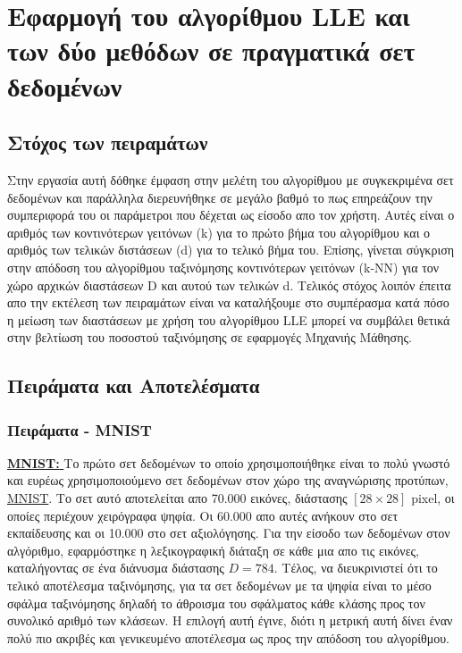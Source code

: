 \chapter{Εφαρμογή του αλγορίθμου \textlatin{LLE} και των δύο μεθόδων σε πραγματικά σετ δεδομένων}
\section{Στόχος των πειραμάτων}
\par
Στην εργασία αυτή δόθηκε έμφαση στην μελέτη του αλγορίθμου με συγκεκριμένα σετ δεδομένων και παράλληλα διερευνήθηκε σε μεγάλο βαθμό το πως επηρεάζουν την συμπεριφορά του οι παράμετροι που δέχεται ως είσοδο απο τον χρήστη. Αυτές είναι ο αριθμός των κοντινότερων γειτόνων \textlatin{(k)} για το πρώτο βήμα του αλγορίθμου και ο αριθμός των τελικών διστάσεων \textlatin{(d)} για το τελικό βήμα του. Επίσης, γίνεται σύγκριση στην απόδοση του αλγορίθμου ταξινόμησης κοντινότερων γειτόνων \textlatin{(k-NN)} για τον χώρο αρχικών διαστάσεων \textlatin{D} και αυτού των τελικών \textlatin{d}. Τελικός στόχος λοιπόν έπειτα απο την εκτέλεση των πειραμάτων είναι να καταλήξουμε στο συμπέρασμα κατά πόσο η μείωση των διαστάσεων με χρήση του αλγορίθμου \textlatin{LLE} μπορεί να συμβάλει θετικά στην βελτίωση του ποσοστού ταξινόμησης σε εφαρμογές Μηχανιής
Μάθησης.

\section{Πειράματα και Αποτελέσματα}

\subsection{Πειράματα - \textlatin{MNIST}}
\par
\href{http://yann.lecun.com/exdb/mnist/}{\textbf{\textlatin{MNIST: }}}Το πρώτο σετ δεδομένων το οποίο χρησιμοποιήθηκε είναι το πολύ γνωστό και ευρέως χρησιμοποιούμενο σετ δεδομένων στον χώρο της αναγνώρισης προτύπων, \href{http://yann.lecun.com/exdb/mnist/}{\textlatin{MNIST}}. Το σετ αυτό αποτελείται απο 70.000 εικόνες, διάστασης $[28 \times 28]$ \textlatin{pixel}, οι οποίες περιέχουν χειρόγραφα ψηφία. Οι 60.000 απο αυτές ανήκουν στο σετ εκπαίδευσης και οι 10.000 στο σετ αξιολόγησης. Για την είσοδο των δεδομένων στον αλγόριθμο, εφαρμόστηκε η λεξικογραφική διάταξη σε κάθε μια απο τις εικόνες, καταλήγοντας σε ένα διάνυσμα διάστασης $D = 784$. Τέλος, να διευκρινιστεί ότι το τελικό αποτέλεσμα ταξινόμησης, για τα σετ δεδομένων με τα ψηφία είναι το μέσο σφάλμα ταξινόμησης δηλαδή το άθροισμα του σφάλματος κάθε κλάσης προς τον συνολικό αριθμό των κλάσεων. Η επιλογή αυτή έγινε, διότι η μετρική αυτή δίνει έναν πολύ πιο ακριβές και γενικευμένο αποτέλεσμα ως προς την απόδοση του αλγορίθμου.

